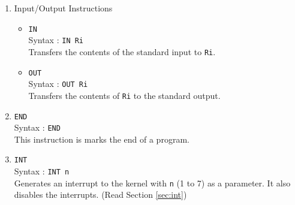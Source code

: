 \documentclass[11pt]{report}
\begin{document}
\begin{enumerate}
\item Input/Output Instructions
\begin{itemize}
\item \texttt{IN}\\
Syntax : \texttt{IN Ri}\\
Transfers the contents of the standard input to \texttt{Ri}.
\item \texttt{OUT}\\
Syntax : \texttt{OUT Ri}\\
Transfers the contents of \texttt{Ri} to the standard output.\\
\end{itemize}

\item \texttt{END}\\
Syntax : \texttt{END}\\
This instruction is marks the end of a program.

\item \texttt{INT}\\
Syntax : \texttt{INT n}\\
Generates an interrupt to the kernel with \texttt{n} (1 to 7) as a parameter. It also disables the interrupts. (Read Section \ref{sec:int})
\end{enumerate}
\end{document}
